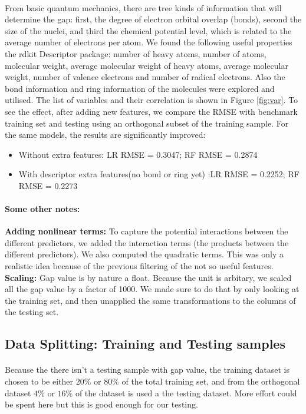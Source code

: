 \documentclass[11pt]{article}
\begin{document}
\paragraph{}
From basic quantum mechanics, there are tree kinds of information that will determine the gap: first, the degree of electron orbital overlap (bonds), second the size of the nuclei, and third the chemical potential level, which is related to the average number of electrons per atom. We found the following useful properties the rdkit Descriptor package: number of heavy atoms, number of atoms, molecular weight, average molecular weight of heavy atoms, average molecular weight, number of valence electrons and number of radical electrons. Also the bond information and ring information of the molecules were explored and utilised. The list of variables and their correlation is shown in Figure \ref{fig:var}. To see the effect, after adding new features, we compare the RMSE with benchmark training set and testing using an orthogonal subset of the training sample. For the same models, the results are significantly improved: 
\begin{itemize}
\item{Without extra features: LR RMSE = 0.3047;  RF RMSE = 0.2874}
\item{With descriptor extra features(no bond or ring yet) :LR RMSE = 0.2252;  RF RMSE = 0.2273}
\end{itemize}
  \paragraph{Some other notes:}
    \textbf{Adding nonlinear terms:} To capture the potential interactions between the different predictors, we added the interaction terms (the products between the different predictors). We also computed the quadratic terms. This was only a realistic idea because of the previous filtering of the not so useful features. \textbf{Scaling:} Gap value is by nature a float. Because the unit is arbitary, we scaled all the gap value by a factor of 1000. We made sure to do that by only looking at the training set, and then unapplied the same transformations to the columns of the testing set.
    
  \subsection{Data Splitting: Training and Testing samples}
\paragraph{}
    Because the there isn't a testing sample with gap value, the training dataset is chosen to be either $20\%$ or $80\%$ of the total training set, and from the orthogonal dataset $4\%$ or $16\%$ of the dataset is used a the testing dataset. More effort could be spent here but this is good enough for our testing.
    
\end{document}
